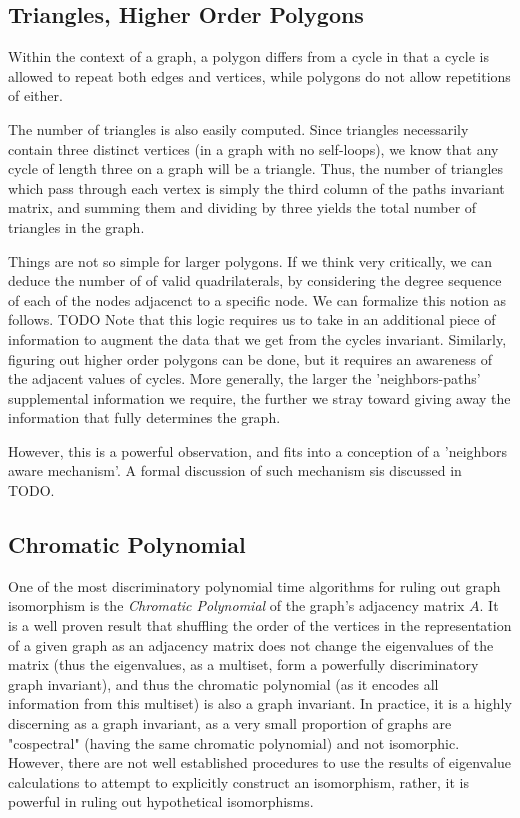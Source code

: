 \documentclass[11pt,a4paper]{report}
\begin{document}
\subsection{Triangles, Higher Order Polygons}
Within the context of a graph, a polygon differs from a cycle in that a cycle is allowed to repeat both edges and vertices, while polygons do not allow repetitions of either.

The number of triangles is also easily computed.  Since triangles necessarily contain three distinct vertices (in a graph with no self-loops), we know that any cycle of length three on a graph will be a triangle.
Thus, the number of triangles which pass through each vertex is simply the third column of the paths invariant matrix, and summing them and dividing by three yields the total number of triangles in the graph.

Things are not so simple for larger polygons.  If we think very critically, we can deduce the number of of valid quadrilaterals, by considering the degree sequence of each of the nodes adjacenct to a specific node.
We can formalize this notion as follows.
TODO
Note that this logic requires us to take in an additional piece of information to augment the data that we get from the cycles invariant.
Similarly, figuring out higher order polygons can be done, but it requires an awareness of the adjacent values of cycles.
More generally, the larger the 'neighbors-paths' supplemental information we require, the further we stray toward giving away the information that fully determines the graph.

However, this is a powerful observation, and fits into a conception of a 'neighbors aware mechanism'. A formal discussion of such mechanism sis discussed in TODO.

\subsection{Chromatic Polynomial}
One of the most discriminatory polynomial time algorithms for ruling out graph isomorphism is the \emph{Chromatic Polynomial} of the graph's adjacency matrix $A$.
It is a well proven result that shuffling the order of the vertices in the representation of a given graph as an adjacency matrix does not change the eigenvalues of the matrix (thus the eigenvalues, as a multiset, form a powerfully discriminatory graph invariant), and thus the chromatic polynomial (as it encodes all information from this multiset) is also a graph invariant.
In practice, it is a highly discerning as a graph invariant, as a very small proportion of graphs are "cospectral" (having the same chromatic polynomial) and not isomorphic.
However, there are not well established procedures to use the results of eigenvalue calculations to attempt to explicitly construct an isomorphism, rather, it is powerful in ruling out hypothetical isomorphisms. 
\end{document}
